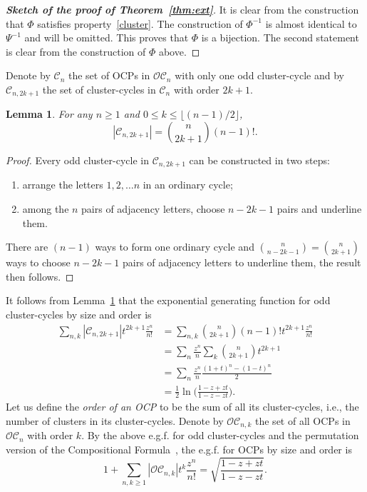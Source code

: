 \documentclass[12pt]{amsart}
\numberwithin{equation}{section}
\theoremstyle{plain}
\newtheorem{lemma}[theorem]{Lemma}
\theoremstyle{definition}
\newcommand{\C}{\mathcal{OC}}
\newcommand{\CC}{\mathcal{C}}
\begin{document}
\begin{proof}[{\bf Sketch of the proof of Theorem~\ref{thm:ext}}]
 It is clear from the construction that $\Phi$ satisfies property~\eqref{cluster}. The construction of $\Phi^{-1}$ is almost identical to $\Psi^{-1}$ and will be omitted. This proves that $\Phi$ is a bijection. The second statement is clear from the construction of $\Phi$ above. 
 \end{proof} 
 Denote by $\CC_n$  the set of OCPs in $\C_n$ with only one odd cluster-cycle  and by $\CC_{n,2k+1}$ the set of cluster-cycles  in $\CC_n$ with order $2k+1$. 
 \begin{lemma}\label{lem:cyc}
 For any $n\geq1$ and $0\leq k\leq \lfloor (n-1)/2\rfloor$, 
 $$
|\CC_{n,2k+1}|={n\choose 2k+1}(n-1)!.
 $$
 \end{lemma}
 \begin{proof}
 Every odd cluster-cycle  in $\CC_{n,2k+1}$ can be constructed in two steps:
 \begin{enumerate}
 \item arrange the letters $1,2,\ldots n$ in an ordinary cycle;
 \item among the $n$ pairs of adjacency letters, choose $n-2k-1$  pairs and underline them. 
 \end{enumerate}
 There are $(n-1)$ ways to form one ordinary cycle  and ${n\choose n-2k-1}={n\choose 2k+1}$ ways to choose $n-2k-1$  pairs of adjacency letters to underline them, the result then follows. 
 \end{proof}
 
 It follows from Lemma~\ref{lem:cyc} that the exponential generating function for odd cluster-cycles by size and order is
 \begin{align*}
 \sum_{n,k}|\CC_{n,2k+1}|t^{2k+1}\frac{z^n}{n!}&=\sum_{n,k}{n\choose 2k+1}(n-1)!t^{2k+1}\frac{z^n}{n!}\\
 &=\sum_n\frac{z^n}{n}\sum_k{n\choose 2k+1}t^{2k+1}\\
 &=\sum_n\frac{z^n}{n}\frac{(1+t)^n-(1-t)^n}{2}\\
 &=\frac{1}{2}\ln\biggl(\frac{1-z+zt}{1-z-zt}\biggr).
 \end{align*}
 Let us define the {\em order of an OCP} to be the sum of all its cluster-cycles, i.e., the number of clusters in its cluster-cycles. Denote by $\C_{n,k}$ the set of all OCPs in $\C_n$ with order $k$. 
 By the above e.g.f. for odd cluster-cycles and the permutation version of the Compositional Formula~\cite[Corollary~5.1.8]{st2}, the e.g.f. for OCPs by size and order is 
 \begin{equation}\label{egf:ocp}
 1+\sum_{n,k\geq1}|\C_{n,k}|t^{k}\frac{z^n}{n!}=\sqrt{\frac{1-z+zt}{1-z-zt}}.
 \end{equation}
 
\end{document}
